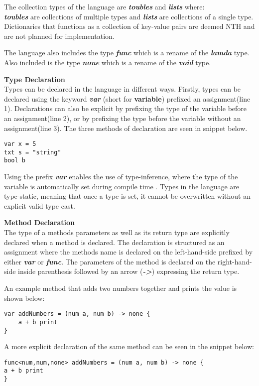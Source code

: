 The collection types of the language are \textbf{\textit{toubles}} and \textbf{\textit{lists}} where:\\
\textbf{\textit{toubles}} are collections of multiple types and \textbf{\textit{lists}} are collections of a single type.
Dictionaries that functions as a collection of key-value pairs are deemed NTH and are not planned for implementation. 

The language also includes the type \textbf{\textit{func}} which is a rename of the \textbf{\textit{lamda}} type.
Also included is the type \textbf{\textit{none}} which is a rename of the \textbf{\textit{void}} type. 

\textbf{Type Declaration}\\
Types can be declared in the language in different ways.
Firstly, types can be declared using the keyword \textbf{\textit{var}} (short for \textbf{variable\textit{}}) prefixed an assignment(line 1).
Declarations can also be explicit by prefixing the type of the variable before an assignment(line 2), or by prefixing the type before the variable without an assignment(line 3).
The three methods of declaration are seen in snippet below.
\begin{lstlisting}
var x = 5
txt s = "string"
bool b
\end{lstlisting}

Using the prefix \textbf{\textit{var}} enables the use of type-inference, where the type of the variable is automatically set during compile time \cite{typeinf}.
Types in the language are type-static, meaning that once a type is set, it cannot be overwritten without an explicit valid type cast.

\textbf{Method Declaration}\\
The type of a methods parameters as well as its return type are explicitly declared when a method is declared. 
The declaration is structured as an assignment where the methods name is declared on the left-hand-side prefixed by either \textbf{\textit{var}} or \textbf{\textit{func}}. 
The parameters of the method is declared on the right-hand-side inside parenthesis followed by an arrow (\textbf{\textit{->}}) expressing the return type. 

An example method that adds two numbers together and prints the value is shown below:
\begin{lstlisting}
var addNumbers = (num a, num b) -> none {
	a + b print
}
\end{lstlisting} 
A more explicit declaration of the same method can be seen in the snippet below:
\begin{lstlisting}
func<num,num,none> addNumbers = (num a, num b) -> none {
a + b print
}
\end{lstlisting}

